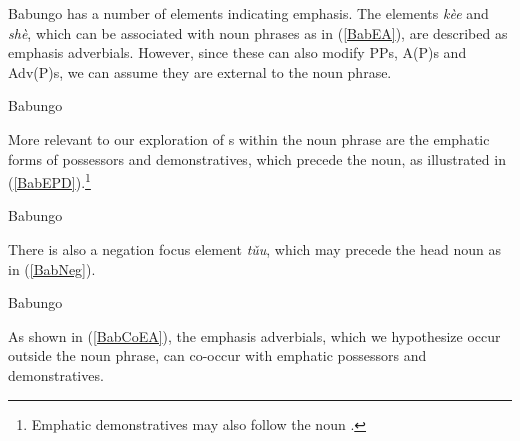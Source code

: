 \documentclass[output=paper,hidelinks]{langscibook}
\begin{document}
Babungo has a number of elements indicating emphasis. The elements \emph{\ng k\`ee} and \emph{sh\`e\textprimstress}, which can be associated with noun phrases as in (\ref{BabEA}), are described as emphasis adverbials. However, since these can also modify PPs, A(P)s and Adv(P)s, we can assume they are external to the noun phrase.

\eal\label{BabEA} Babungo
\zl

More relevant to our exploration of {\DF}s within the noun phrase are the emphatic forms of possessors and demonstratives, which precede the noun, as illustrated in (\ref{BabEPD}).\footnote{Emphatic demonstratives may also follow the noun \citep[73]{Schaub85}.}

\eal\label{BabEPD} Babungo
\zl

There is also a negation focus element \emph{t\v{u}u}, which may precede the head noun as in (\ref{BabNeg}).

\eal\label{BabNeg} Babungo
\zl

As shown in (\ref{BabCoEA}), the emphasis adverbials, which we hypothesize occur outside the noun phrase, can co-occur with emphatic possessors and demonstratives.
\end{document}
